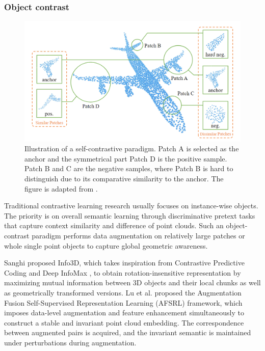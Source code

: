 \documentclass[a4paper,fleqn]{cas-dc}
\begin{document}
\subsubsection{Object contrast}

\begin{figure}[htbp]
    \centering
    \includegraphics[width=0.97\linewidth]{hard_negative_sampling.png}
    \caption{Illustration of a self-contrastive paradigm. Patch A is selected as the anchor and the symmetrical part Patch D is the positive sample. Patch B and C are the negative samples, where Patch B is hard to distinguish due to its comparative similarity to the anchor. The figure is adapted from \citep{du2021self}.}
    \label{fig:hard_negative_sampling}
\end{figure}


Traditional contrastive learning research usually focuses on instance-wise objects. The priority is on overall semantic learning through discriminative pretext tasks that capture context similarity and difference of point clouds. Such an object-contrast paradigm performs data augmentation on relatively large patches or whole single point objects to capture global geometric awareness.

Sanghi \citep{sanghi2020info3d} proposed Info3D, which takes inspiration from Contrastive Predictive Coding \citep{oord2018representation} and Deep InfoMax \citep{velickovic2019deep}, to obtain rotation-insensitive representation by maximizing mutual information between 3D objects and their local chunks as well as geometrically transformed versions. Lu et al. \citep{lu2022joint} proposed the Augmentation Fusion Self-Supervised Representation Learning (AFSRL) framework, which imposes data-level augmentation and feature enhancement simultaneously to construct a stable and invariant point cloud embedding. The correspondence between augmented pairs is acquired, and the invariant semantic is maintained under perturbations during augmentation. 
\end{document}
